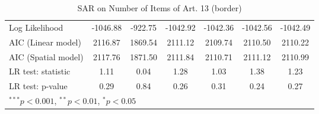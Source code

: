\begin{table}[!h]
\begin{center}
\begin{tabular}{l c c c c c c }
Log Likelihood          & -1046.88    & -922.75    & -1042.92    & -1042.36    & -1042.56    & -1042.49    \\
AIC (Linear model)      & 2116.87     & 1869.54    & 2111.12     & 2109.74     & 2110.50     & 2110.22     \\
AIC (Spatial model)     & 2117.76     & 1871.50    & 2111.84     & 2110.71     & 2111.12     & 2110.99     \\
LR test: statistic      & 1.11        & 0.04       & 1.28        & 1.03        & 1.38        & 1.23        \\
LR test: p-value        & 0.29        & 0.84       & 0.26        & 0.31        & 0.24        & 0.27        \\
\bottomrule
\multicolumn{7}{l}{\scriptsize{$^{***}p<0.001$, $^{**}p<0.01$, $^*p<0.05$}}
\end{tabular}
\caption{SAR on Number of Items of Art. 13 (border)}
\label{table:coefficients}
\end{center}
\end{table}
